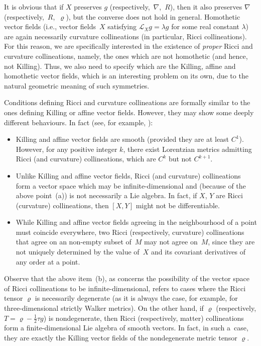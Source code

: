 \documentclass[pdftex]{sigma}
\numberwithin{equation}{section}
\begin{document}
It is obvious that if $X$ preserves $g$ (respectively,~$\nabla$,~$R$), then it also preserves $\nabla$ (respective\-ly,~$R$,~$\varrho$), but the converse does not hold in general. Homothetic vector f\/ields (i.e., vector f\/ields~$X$ satisfying $\mathcal L _X g=\lambda g$ for some real constant $\lambda$) are again necessarily curvature collineations (in particular, Ricci collineations). For this reason, we are specif\/ically interested in the existence of {\em proper} Ricci and curvature collineations, namely, the ones which are not homothetic (and hence, not Killing). Thus, we also need to specify which are the Killing, af\/f\/ine and homothetic vector f\/ields, which is an interesting problem on its own, due to the natural geometric meaning of such symmetries.

Conditions def\/ining Ricci and curvature collineations are formally similar to the ones def\/ining Killing or af\/f\/ine vector f\/ields. However, they may show some deeply dif\/ferent behaviours. In fact (see, for example, \cite{Hall,HRV}):
\begin{itemize}\itemsep=0pt
\item[(a)] Killing and af\/f\/ine vector f\/ields are smooth (provided they are at least $C^1$). However, for any positive integer $k$, there exist Lorentzian metrics admitting Ricci {(and curvature)} collineations, which are $C^k$ but not $C^{k+1}$.
\item[(b)] Unlike Killing and af\/f\/ine vector f\/ields, Ricci (and curvature) collineations form a vector space which may be inf\/inite-dimensional and (because of the above point~(a)) is not necessarily a Lie algebra. In fact, if $X$, $Y$ are Ricci (curvature) collineations, then $[X,Y]$ might not be dif\/ferentiable.
\item[(c)] While Killing and af\/f\/ine vector f\/ields agreeing in the neighbourhood of a point must coincide everywhere, two Ricci (respectively, curvature) collineations that agree on an non-empty subset of~$M$ may not agree on~$M$, since they are not uniquely determined by the value of~$X$ and its covariant derivatives of any order at a point.
\end{itemize}

Observe that the above item~(b), as concerns the possibility of the vector space of Ricci collineations to be inf\/inite-dimensional, refers to cases where the Ricci tensor $\varrho$ is necessarily degenerate (as it is always the case, for example, for three-dimensional strictly Walker metrics). On the other hand, if $\varrho$ (respectively, $T=\varrho-\frac{1}{2}\tau g$) is nondegenerate, then Ricci (respectively, matter) collineations form a f\/inite-dimensional Lie algebra of smooth vectors. In fact, in such a~case, they are exactly the Killing vector f\/ields of the nondegenerate metric tensor $\varrho$.
\end{document}
